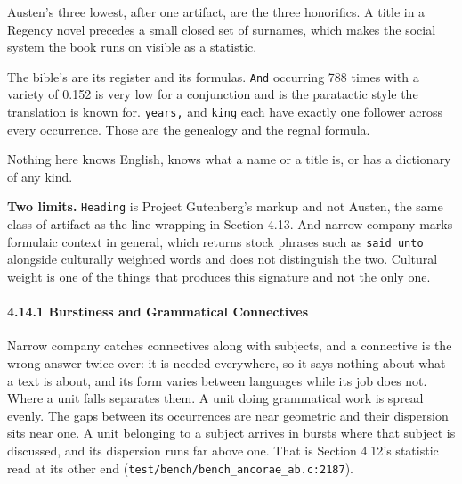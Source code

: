 Austen's three lowest, after one artifact, are the three honorifics. A title in a Regency novel precedes a small closed set of surnames, which makes the social system the book runs on visible as a statistic.

The bible's are its register and its formulas. \texttt{And} occurring 788 times with a variety of 0.152 is very low for a conjunction and is the paratactic style the translation is known for. \texttt{years,} and \texttt{king} each have exactly one follower across every occurrence. Those are the genealogy and the regnal formula.

Nothing here knows English, knows what a name or a title is, or has a dictionary of any kind.

\textbf{Two limits.} \texttt{Heading} is Project Gutenberg's markup and not Austen, the same class of artifact as the line wrapping in Section 4.13. And narrow company marks formulaic context in general, which returns stock phrases such as \texttt{said unto} alongside culturally weighted words and does not distinguish the two. Cultural weight is one of the things that produces this signature and not the only one.

\paragraph{4.14.1 Burstiness and Grammatical Connectives}

Narrow company catches connectives along with subjects, and a connective is the wrong answer twice over: it is needed everywhere, so it says nothing about what a text is about, and its form varies between languages while its job does not. Where a unit falls separates them. A unit doing grammatical work is spread evenly. The gaps between its occurrences are near geometric and their dispersion sits near one. A unit belonging to a subject arrives in bursts where that subject is discussed, and its dispersion runs far above one. That is Section 4.12's statistic read at its other end (\texttt{test/\allowbreak{}bench/\allowbreak{}bench\_\allowbreak{}ancorae\_\allowbreak{}ab.\allowbreak{}c:2187}).

